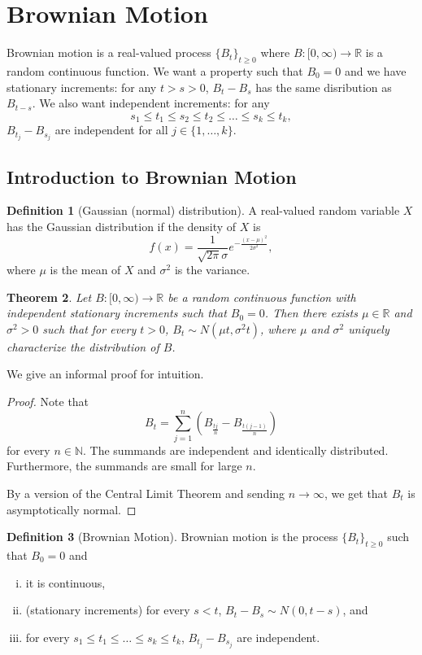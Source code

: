 \documentclass{tufte-handout}
\newcommand*\N{\mathbb{N}}
\newcommand*\R{\mathbb{R}}
\newtheorem{thm}{Theorem}[subsection]
\theoremstyle{definition}
\newtheorem{defn}[thm]{Definition}
\begin{document}
\section{Brownian Motion}

Brownian motion is a real-valued process $\{B_t\}_{t\ge 0}$ where $B: [0,\infty) \to \R$ is a random continuous function. We want a property such that $B_0=0$ and we have stationary increments: for any $t > s> 0$, $B_t - B_s$ has the same disribution as $B_{t-s}$. We also want independent increments: for any \[
	s_1 \le t_1 \le s_2 \le t_2 \le \ldots \le s_k \le t_k
,\] $B_{t_j} - B_{s_j}$ are independent for all $j \in \{1,\ldots,k\}$.

\subsection{Introduction to Brownian Motion}

\begin{defn}[Gaussian (normal) distribution]
	A real-valued random variable $X$ has the Gaussian distribution if the density of $X$ is \[
		f(x) = \frac{1}{\sqrt{2\pi} \sigma} e^{-\frac{\left( x-\mu \right)^2}{2\sigma^2}}
	,\] where $\mu$ is the mean of $X$ and $\sigma^2$ is the variance.
\end{defn}

\begin{thm}
	Let $B: [0,\infty)\to \R$ be a random continuous function with independent stationary increments such that $B_0 = 0$. Then there exists $\mu \in \R$ and $\sigma^2 > 0 $ such that for every $t > 0$, $B_t \sim N(\mu t ,\sigma^2 t)$, where $\mu$ and $\sigma^2$ uniquely characterize the distribution of $B$.
\end{thm}
We give an informal proof for intuition.	
\begin{proof}
	Note that \[
		B_t = \sum\limits_{j=1}^{n} \left( B_{\frac{tj}{n}} - B_{\frac{t(j-1)}{n}} \right)
	\] for every $n \in \N$. The summands are independent and identically distributed. Furthermore, the summands are small for large $n$.

	By a version of the Central Limit Theorem and sending $n\to \infty$, we get that $B_t$ is asymptotically normal.
\end{proof}

\begin{defn}[Brownian Motion]
	Brownian motion is the process $\{B_t\}_{t\ge 0}$ such that $B_0 = 0$ and
	\begin{enumerate}[(i)]
		\item it is continuous,
		\item (stationary increments) for every $s < t$, $B_t - B_s \sim  N(0,t-s)$, and
		\item for every $s_1\le t_1\le\ldots\le s_k \le t_k$, $B_{t_j} - B_{s_j}$ are independent.
	\end{enumerate}
\end{defn}
\end{document}
